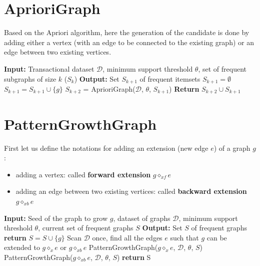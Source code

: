 \documentclass[12pt, openany]{report}
\theoremstyle{definition}
\begin{document}
\section{AprioriGraph}
Based on the Apriori algorithm, here the generation of the candidate is done by adding either a vertex (with an edge to be connected to the existing graph) or an edge between two existing vertices. 
\begin{algorithm}[H]
    \caption{AprioriGraph algorithm}
    \begin{algorithmic}[1]
        \State \textbf{Input:} Transactional dataset $\mathcal{D}$, minimum support threshold $\theta$, set of frequent subgraphs of size $k$ ($S_k$)
        \State \textbf{Output:} Set $S_{k+1}$ of frequent itemsets
        \State $S_{k+1} = \emptyset$
                        \State $S_{k+1} = S_{k+1} \cup \{g\}$
                    \EndIf
                \EndFor
            \EndFor
        \EndFor 
            \State $S_{k+2}$ = AprioriGraph($\mathcal{D}$, $\theta$, $S_{k+1}$)
            \State \textbf{Return} $S_{k+2} \cup S_{k+1}$
        \EndIf
    \end{algorithmic}
\end{algorithm}
\section{PatternGrowthGraph}
First let us define the notations for adding an extension (new edge $e$) of a graph $g$:
\begin{itemize}
    \item adding a vertex: called \textbf{forward extension} $g \diamond_{xf} e$
    \item adding an edge between two existing vertices: called \textbf{backward extension} $g \diamond_{xb} e$
\end{itemize}
\begin{algorithm}[H]
    \caption{PatternGrowthGraph algorithm}
    \begin{algorithmic}[1]
        \State \textbf{Input:} Seed of the graph to grow $g$, dataset of graphs $\mathcal{D}$, minimum support threshold $\theta$, current set of frequent graphs $S$
        \State \textbf{Output:} Set $S$ of frequent graphs
            \State \textbf{return}
        \Else
            \State $S = S \cup \{g\}$
        \EndIf
        \State Scan $\mathcal{D}$ once, find all the edges $e$ such that $g$ can be extended to $g \diamond_x e$ or $g \diamond_{xb} e$
            \State PatternGrowthGraph($g \diamond_x e$, $\mathcal{D}$, $\theta$, $S$)
        \EndFor
            \State PatternGrowthGraph($g \diamond_{xb} e$, $\mathcal{D}$, $\theta$, $S$)
        \EndFor
        \State \textbf{return} S
    \end{algorithmic}
\end{algorithm}
\end{document}
